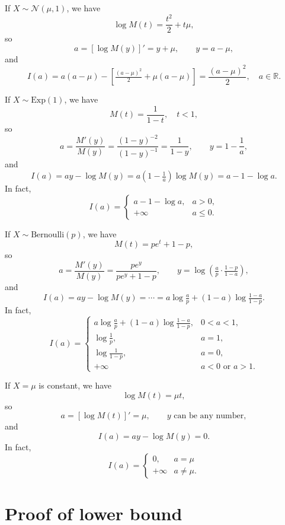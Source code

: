 \documentclass[12pt]{article}
\theoremstyle{definition}
\newcommand{\R}{\mathbb{R}}
\renewcommand{\leq}{\leqslant}
\begin{document}
If $X\sim\mathcal{N}(\mu,1)$, we have
\[
\log M(t)= \frac{t^2}{2} + t\mu
,
\]
so
\[
a = [\log M(y)]' = y + \mu
,
\qquad
y = a - \mu
,
\]
and
\[
I(a)
=
 a(a-\mu) - \left[ \tfrac{(a-\mu)^2}{2} + \mu(a-\mu) \right]
=
\frac{(a-\mu)^2}{2}
, \quad a \in \R
.
\]

If $X\sim\mathrm{Exp}(1)$, we have
\[
M(t)= \frac{1}{1-t}
,
\quad t<1
,
\]
so
\[
a = \frac{M'(y)}{M(y)} = \frac{(1-y)^{-2}}{(1-y)^{-1}} = \frac{1}{1-y}
,
\qquad
y = 1 - \frac{1}{a}
,
\]
and
\[
I(a)
=
ay-\log M(y)
=
a(1-\tfrac{1}{a}) \log M(y) = a-1-\log a
.
\]
In fact,
\[
I(a) =
\begin{cases}
a-1-\log a ,& a > 0, \\
+\infty & a \leq 0.
\end{cases}
\]

If $X\sim\mathrm{Bernoulli}(p)$, we have
\[
M(t)= p e^t + 1-p
,
\]
so
\[
a = \frac{M'(y)}{M(y)} = \frac{pe^y}{pe^y + 1-p}
,
\qquad
y = \log ( \tfrac{a}{p} \cdot \tfrac{1-p}{1-a} )
,
\]
and
\[
I(a)
=
ay-\log M(y)
=
\cdots
=
a \log \tfrac{a}{p} + (1-a) \log \tfrac{1-a}{1-p}
.
\]
In fact,
\[
I(a) =
\begin{cases}
a \log \tfrac{a}{p} + (1-a) \log \tfrac{1-a}{1-p} ,&  0 < a < 1, \\
\log\tfrac{1}{p} ,& a=1, \\
\log\tfrac{1}{1-p} ,& a=0, \\
+\infty & a < 0 \text{ or } a>1.
\end{cases}
\]

If $X=\mu$ is constant,
we have
\[
\log M(t)= \mu t
,
\]
so
\[
a = [\log M(t)]' = \mu
,
\qquad
y \text{ can be any number}
,
\]
and
\[
I(a)
=
ay-\log M(y)
=
0
.
\]
In fact,
\[
I(a) =
\begin{cases}
0 ,&  a=\mu \\
+\infty & a \ne \mu.
\end{cases}
\]


\section{Proof of lower bound}
\end{document}

